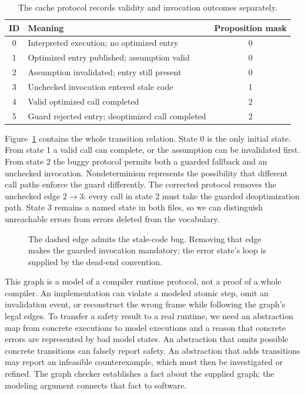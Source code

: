\begin{table}[htbp]
  \caption{The cache protocol records validity and invocation outcomes separately.}
  \label{tab:ch48-states}
  \centering
  \begin{tabular}{clc}
    \toprule
    ID & Meaning & Proposition mask \\
    \midrule
    0 & Interpreted execution; no optimized entry & 0 \\
    1 & Optimized entry published; assumption valid & 0 \\
    2 & Assumption invalidated; entry still present & 0 \\
    3 & Unchecked invocation entered stale code & 1 \\
    4 & Valid optimized call completed & 2 \\
    5 & Guard rejected entry; deoptimized call completed & 2 \\
    \bottomrule
  \end{tabular}
\end{table}

Figure~\ref{fig:ch48-cache} contains the whole transition relation.
State 0 is the only initial state.
From state 1 a valid call can complete, or the assumption can be invalidated first.
From state 2 the buggy protocol permits both a guarded fallback and an unchecked invocation.
Nondeterminism represents the possibility that different call paths enforce the guard differently.
The corrected protocol removes the unchecked edge $2\to3$: every call in state 2 must take the guarded deoptimization path.
State 3 remains a named state in both files, so we can distinguish unreachable errors from errors deleted from the vocabulary.

\begin{figure}[htbp]
  \centering
  
  \caption{The dashed edge admits the stale-code bug. Removing that edge makes the guarded invocation mandatory; the error state's loop is supplied by the dead-end convention.}
  \label{fig:ch48-cache}
\end{figure}

This graph is a model of a compiler runtime protocol, not a proof of a whole compiler.
An implementation can violate a modeled atomic step, omit an invalidation event, or reconstruct the wrong frame while following the graph's legal edges.
To transfer a safety result to a real runtime, we need an abstraction map from concrete executions to model executions and a reason that concrete errors are represented by bad model states.
An abstraction that omits possible concrete transitions can falsely report safety.
An abstraction that adds transitions may report an infeasible counterexample, which must then be investigated or refined.
The graph checker establishes a fact about the supplied graph; the modeling argument connects that fact to software.

